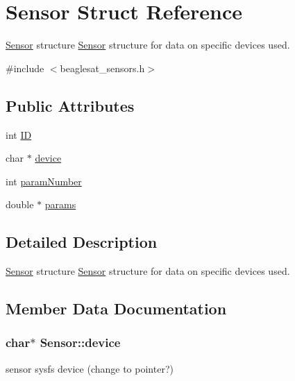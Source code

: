 \hypertarget{structSensor}{}\section{Sensor Struct Reference}
\label{structSensor}


\hyperlink{structSensor}{Sensor} structure \hyperlink{structSensor}{Sensor} structure for data on specific devices used.  




{\ttfamily \#include $<$beaglesat\+\_\+sensors.\+h$>$}

\subsection*{Public Attributes}
\begin{DoxyCompactItemize}
\item 
int \hyperlink{structSensor_abc79ffcb2e0783e2f6000c011c65fb07}{I\+D}
\item 
char $\ast$ \hyperlink{structSensor_ae4c8ac52a89b429390bd9af94d31854a}{device}
\item 
int \hyperlink{structSensor_ada1a837f41f7db788c26375b801b616d}{param\+Number}
\item 
double $\ast$ \hyperlink{structSensor_a5c7e519f5a64497c0e2e1144a1729211}{params}
\end{DoxyCompactItemize}


\subsection{Detailed Description}
\hyperlink{structSensor}{Sensor} structure \hyperlink{structSensor}{Sensor} structure for data on specific devices used. 

\subsection{Member Data Documentation}
\hypertarget{structSensor_ae4c8ac52a89b429390bd9af94d31854a}{}
\subsubsection[{device}]{\setlength{\rightskip}{0pt plus 5cm}char$\ast$ Sensor\+::device}\label{structSensor_ae4c8ac52a89b429390bd9af94d31854a}
sensor sysfs device (change to pointer?) \hypertarget{structSensor_abc79ffcb2e0783e2f6000c011c65fb07}{}
